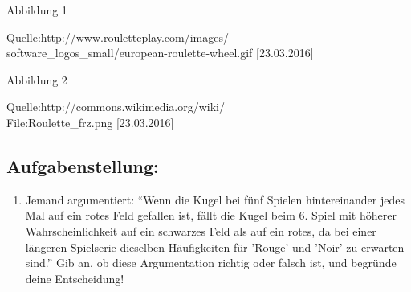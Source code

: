 \begin{langesbeispiel}
{Abbildung 1

\begin{scriptsize}\begin{singlespace}Quelle:http://www.rouletteplay.com/images/\\
software\_logos\_small/european-roulette-wheel.gif [23.03.2016]\end{singlespace}\end{scriptsize}}{

Abbildung 2

\begin{scriptsize}\begin{singlespace}Quelle:http://commons.wikimedia.org/wiki/\\
File:Roulette\_frz.png [23.03.2016]\end{singlespace}\end{scriptsize}}
 

\subsection{Aufgabenstellung:}
\begin{enumerate}
	\item Jemand argumentiert: "`Wenn die Kugel bei fünf Spielen hintereinander jedes Mal auf ein rotes Feld gefallen ist, fällt die Kugel beim 6. Spiel mit höherer Wahrscheinlichkeit auf ein schwarzes Feld als auf ein rotes, da bei einer längeren Spielserie dieselben Häufigkeiten für 'Rouge' und 'Noir' zu erwarten sind."' Gib an, ob diese Argumentation richtig oder falsch ist, und begründe deine Entscheidung!\leer
	

\end{enumerate}
\end{langesbeispiel}
